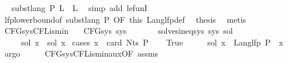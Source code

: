 \begin{isabellebody}
\ \isamarkupfalse%
\ {\isachardoublequoteopen}subst{\isacharunderscore}{\kern0pt}lang\ P\ {\isacharquery}{\kern0pt}L{\isacharprime}{\kern0pt}\ {\isasymle}\ {\isacharquery}{\kern0pt}L{\isacharprime}{\kern0pt}{\isachardoublequoteclose}\ \isamarkupfalse%
\ {\isacharparenleft}{\kern0pt}simp\ add{\isacharcolon}{\kern0pt}\ le{\isacharunderscore}{\kern0pt}funI{\isacharparenright}{\kern0pt}\isanewline
\ \ \isamarkupfalse%
\ lfp{\isacharunderscore}{\kern0pt}lowerbound{\isacharbrackleft}{\kern0pt}of\ {\isachardoublequoteopen}subst{\isacharunderscore}{\kern0pt}lang\ P{\isachardoublequoteclose}{\isacharcomma}{\kern0pt}\ OF\ this{\isacharbrackright}{\kern0pt}\ Lang{\isacharunderscore}{\kern0pt}lfp{\isacharunderscore}{\kern0pt}def\ \isamarkupfalse%
\ {\isacharquery}{\kern0pt}thesis\ \isamarkupfalse%
\ metis\isanewline
{}\isamarkupfalse%
%
\endisatagproof
{\isafoldproof}%
%
\isadelimproof
\isanewline
%
\endisadelimproof
\isanewline
{}\isamarkupfalse%
\ CFG{\isacharunderscore}{\kern0pt}sys{\isacharunderscore}{\kern0pt}CFL{\isacharunderscore}{\kern0pt}is{\isacharunderscore}{\kern0pt}min{\isacharcolon}{\kern0pt}\isanewline
\ \ \ {\isachardoublequoteopen}CFG{\isacharunderscore}{\kern0pt}sys\ sys{\isachardoublequoteclose}\isanewline
\ \ \ \ \ \ \ {\isachardoublequoteopen}solves{\isacharunderscore}{\kern0pt}ineq{\isacharunderscore}{\kern0pt}sys\ sys\ sol{\isacharprime}{\kern0pt}{\isachardoublequoteclose}\isanewline
\ \ \ \ \ {\isachardoublequoteopen}sol\ x\ {\isasymsubseteq}\ sol{\isacharprime}{\kern0pt}\ x{\isachardoublequoteclose}\isanewline
%
\isadelimproof
%
\endisadelimproof
%
\isatagproof
{}\isamarkupfalse%
\ {\isacharparenleft}{\kern0pt}cases\ {\isachardoublequoteopen}x\ {\isacharless}{\kern0pt}\ card\ {\isacharparenleft}{\kern0pt}Nts\ P{\isacharparenright}{\kern0pt}{\isachardoublequoteclose}{\isacharparenright}{\kern0pt}\isanewline
\ \ \isamarkupfalse%
\ True\isanewline
\ \ \isamarkupfalse%
\ \isamarkupfalse%
\ {\isachardoublequoteopen}sol\ x\ {\isacharequal}{\kern0pt}\ Lang{\isacharunderscore}{\kern0pt}lfp\ P\ {\isacharparenleft}{\kern0pt}{\isasymgamma}\ x{\isacharparenright}{\kern0pt}{\isachardoublequoteclose}\ \isamarkupfalse%
\ argo\isanewline
\ \ \isamarkupfalse%
\ \isamarkupfalse%
\ CFG{\isacharunderscore}{\kern0pt}sys{\isacharunderscore}{\kern0pt}CFL{\isacharunderscore}{\kern0pt}is{\isacharunderscore}{\kern0pt}min{\isacharunderscore}{\kern0pt}aux{\isacharbrackleft}{\kern0pt}OF\ assms{\isacharbrackright}{\kern0pt}\ \isamarkupfalse%

\end{isabellebody}
